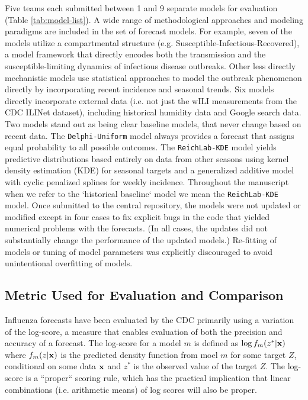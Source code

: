 \documentclass{article}
\begin{document}
Five teams each submitted between 1 and 9 separate models for evaluation (Table \ref{tab:model-list}). 
A wide range of methodological approaches and modeling paradigms are included in the set of forecast models.
For example, seven of the models utilize a compartmental structure (e.g. Susceptible-Infectious-Recovered), a model framework that directly encodes both the transmission and the susceptible-limiting dynamics of infectious disease outbreaks.
Other less directly mechanistic models use statistical approaches to model the outbreak phenomenon directly by incorporating recent incidence and seasonal trends.
Six models directly incorporate external data (i.e. not just the wILI measurements from the CDC ILINet dataset), including historical humidity data and Google search data.
Two models stand out as being clear baseline models, that never change based on recent data. 
The {\tt Delphi-Uniform} model always provides a forecast that assigns equal probability to all possible outcomes. 
The {\tt ReichLab-KDE} model yields predictive distributions based entirely on data from other seasons using kernel density estimation (KDE) for seasonal targets and a generalized additive model with cyclic penalized splines for weekly incidence.
Throughout the manuscript when we refer to the `historical baseline` model we mean the {\tt ReichLab-KDE} model.
Once submitted to the central repository, the models were not updated or modified except in four cases to fix explicit bugs in the code that yielded numerical problems with the forecasts. 
(In all cases, the updates did not substantially change the performance of the updated models.)
Re-fitting of models or tuning of model parameters was explicitly discouraged to avoid unintentional overfitting of models.



\subsection{Metric Used for Evaluation and Comparison}

Influenza forecasts have been evaluated by the CDC primarily using a variation of the log-score, a measure that enables evaluation of both the precision and accuracy of a forecast.\cite{Gneiting2007} 
The log-score for a model $m$ is defined as $\log f_m(z^*|\bf{x})$ where $f_m(z|\bf{x})$ is the predicted density function from moel $m$ for some target $Z$, conditional on some data $\bf{x}$ and $z^*$ is the observed value of the target $Z$. 
The log-score is a ``proper`` scoring rule, which has the practical implication that linear combinations (i.e. arithmetic means) of log scores will also be proper.
\end{document}
